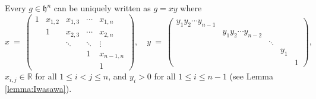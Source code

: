 \documentclass[12pt, reqno, oneside]{amsart}
\numberwithin{equation}{section}
\begin{document}
Every $g \in \mathfrak{h}^n$ can be uniquely written as $g = xy$ where
\begin{equation}\label{eq:upper-half-plane2}
x \ = \ 
\left(\begin{smallmatrix}
  1 & x_{1,2} & x_{1,3} & \cdots & x_{1,n} \\
  & 1 & x_{2,3} & \cdots & x_{2,n} \\
  & &  \ddots & \ddots & \vdots \\
  & & & 1 & x_{n-1,n} \\
  & & & & 1
\end{smallmatrix}\right), \quad y \ = \ \left(\begin{smallmatrix}
y_1 y_2 \cdots y_{n-1} & & & & \\
& y_1 y_2 \cdots y_{n-2} & & & \\
& & \ddots & & \\
& & & y_1 & \\
& & & & 1
\end{smallmatrix}\right),
\end{equation}
$x_{i,j} \in \mathbb{R}$ for all $1 \leq i < j \leq n$, and $y_i > 0$ for all $1 \leq i \leq n-1$ (see Lemma \ref{lemma:Iwasawa}). 
\end{document}
